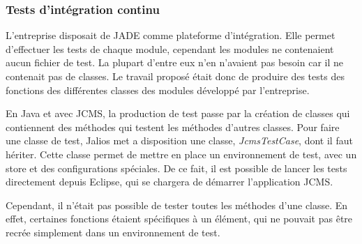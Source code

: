 \documentclass[12pt,a4paper]{article}
\begin{document}
\subsubsection{Tests d'intégration continu}
L'entreprise disposait de \gls{JADE} comme plateforme d'intégration. Elle permet d'effectuer les tests de chaque module, cependant les modules ne contenaient aucun fichier de test. La plupart d'entre eux n'en n'avaient pas besoin car il ne contenait pas de classes. Le travail proposé était donc de produire des tests des fonctions des différentes classes des modules développé par l'entreprise.\par
En Java et avec \gls{JCMS}, la production de test passe par la création de classes qui contiennent des méthodes qui testent les méthodes d'autres classes. Pour faire une classe de test, Jalios met a disposition une classe, \textit{JcmsTestCase}, dont il faut hériter. Cette classe permet de mettre en place un environnement de test, avec un store et des configurations spéciales. De ce fait, il est possible de lancer les tests directement depuis Eclipse, qui se chargera de démarrer l'application \gls{JCMS}.\par
Cependant, il n'était pas possible de tester toutes les méthodes d'une classe. En effet, certaines fonctions étaient spécifiques à un élément, qui ne pouvait pas être recrée simplement dans un environnement de test.\par 

\newpage
\end{document}
